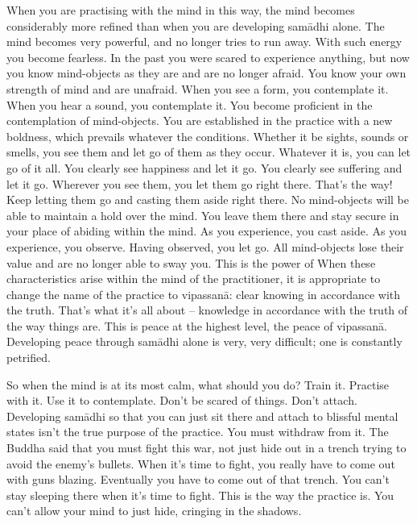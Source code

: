 When you are practising with the mind in this way, the mind becomes considerably more refined than when you are developing sam\=adhi alone. The mind becomes very powerful, and no longer tries to run away. With such energy you become fearless. In the past you were scared to experience anything, but now you know mind-objects as they are and are no longer afraid. You know your own strength of mind and are unafraid. When you see a form, you contemplate it. When you hear a sound, you contemplate it. You become proficient in the contemplation of mind-objects. You are established in the practice with a new boldness, which prevails whatever the conditions. Whether it be sights, sounds or smells, you see them and let go of them as they occur. Whatever it is, you can let go of it all. You clearly see happiness and let it go. You clearly see suffering and let it go. Wherever you see them, you let them go right there. That's the way! Keep letting them go and casting them aside right there. No mind-objects will be able to maintain a hold over the mind. You leave them there and stay secure in your place of abiding within the mind. As you experience, you cast aside. As you experience, you observe. Having observed, you let go. All mind-objects lose their value and are no longer able to sway you. This is the power of  When these characteristics arise within the mind of the practitioner, it is appropriate to change the name of the practice to vipassan\=a: clear knowing in accordance with the truth. That's what it's all about -- knowledge in accordance with the truth of the way things are. This is peace at the highest level, the peace of vipassan\=a. Developing peace through sam\=adhi alone is very, very difficult; one is constantly petrified.

So when the mind is at its most calm, what should you do? Train it. Practise with it. Use it to contemplate. Don't be scared of things. Don't attach. Developing sam\=adhi so that you can just sit there and attach to blissful mental states isn't the true purpose of the practice. You must withdraw from it. The Buddha said that you must fight this war, not just hide out in a trench trying to avoid the enemy's bullets. When it's time to fight, you really have to come out with guns blazing. Eventually you have to come out of that trench. You can't stay sleeping there when it's time to fight. This is the way the practice is. You can't allow your mind to just hide, cringing in the shadows.

